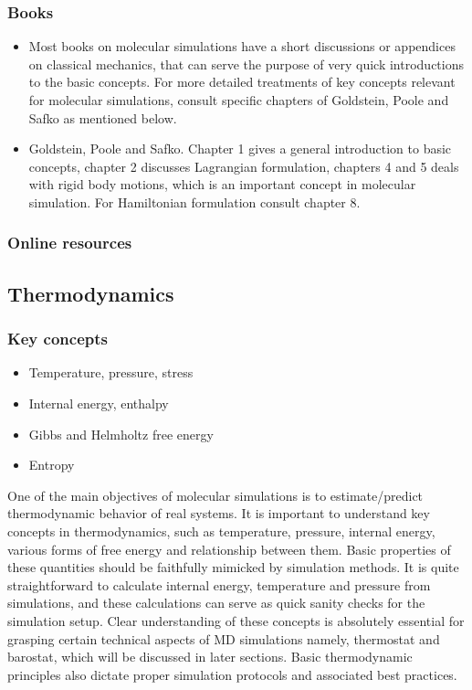 \documentclass[9pt,bestpractices]{livecoms}
\begin{document}
\subsubsection{Books}
\begin{itemize}
\item Most books on molecular simulations have a short discussions or appendices on classical mechanics, that can serve the purpose of very quick introductions to the basic concepts. For more detailed treatments of key concepts relevant for molecular simulations, consult specific chapters of Goldstein, Poole and Safko as mentioned below.

\item Goldstein, Poole and Safko. Chapter 1 gives a general introduction to basic concepts, chapter 2 discusses Lagrangian formulation, chapters 4 and 5 deals with rigid body motions, which is an important concept in molecular simulation. For Hamiltonian formulation consult chapter 8.
\end{itemize}

\subsubsection{Online resources}


\subsection{Thermodynamics}
\label{sec:thermodynamics}
\subsubsection{Key concepts}
\begin{itemize}
\item Temperature, pressure, stress
\item Internal energy, enthalpy
\item Gibbs and Helmholtz free energy
\item Entropy
\end{itemize}

One of the main objectives of molecular simulations is to estimate/predict thermodynamic behavior of real systems. 
It is important to understand key concepts in thermodynamics, such as temperature, pressure, internal energy, various forms of free energy and relationship between them. 
Basic properties of these quantities should be faithfully mimicked by simulation methods. 
It is quite straightforward to calculate internal energy, temperature and pressure from simulations, and these calculations can serve as quick sanity checks for the simulation setup. 
Clear understanding of these concepts is absolutely essential for grasping certain technical aspects of MD simulations namely, thermostat and barostat, which will be discussed in later sections. 
Basic thermodynamic principles also dictate proper simulation protocols and associated best practices.
\end{document}
